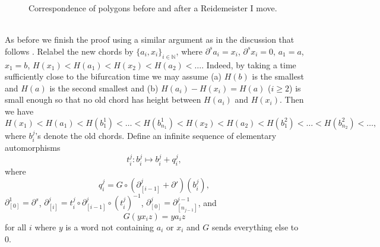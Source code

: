 \documentclass[11pt]{amsart}
\makeatletter
\renewenvironment{proof}[1][\proofname] {\par\pushQED{\qed}{\normalfont\bfseries\topsep6\p@\@plus6\p@\relax #1\@addpunct{.} }}{\popQED\endtrivlist\@endpefalse}
\theoremstyle{mystyle}
\newcommand{\<}{\langle}
\renewcommand{\>}{\rangle}
\makeatother
\begin{document}
\begin{proof}
\begin{proof}
\begin{figure}[h]
\begin{center}

                \caption{Correspondence of polygons before and after a Reidemeister I move.}
                \label{reidICorr2}
            \end{center}
        \end{figure}
	\end{proof}
	
	\text{ }\\ As before we finish the proof using a similar argument as in the discussion that follows \cite[Lemma 8.2]{chekanov2002dga}. Relabel the new chords by $\{a_i, x_i\}_{i \in \mathbb{N}}$, where $\partial^s a_i = x_i$, $\partial^s x_i = 0$, $a_1 = a$, $x_1 = b$, $H(x_1) < H(a_1) < H(x_2) < H(a_2) < \ldots$. Indeed, by taking a time sufficiently close to the bifurcation time we may assume (a) $H(b)$ is the smallest and $H(a)$ is the second smallest and (b) $H(a_i) - H(x_i) = H(a)$ ($i \geq 2$) is small enough so that no old chord has height between $H(a_i)$ and $H(x_i)$. Then we have \[H(x_1) < H(a_1) < H(b_1^1) < \ldots < H(b_{n_1}^1) < H(x_2) < H(a_2) < H(b_1^2) < \ldots < H(b_{n_2}^2) < \ldots,\] where $b_i^j$'s denote the old chords. Define an infinite sequence of elementary automorphisms \[t_i^j: b_i^j \mapsto b_i^j + q_i^j,\] where \[q_i^j = G \circ (\partial_{[i-1]}^j + \partial')(b_i^j),\] $\partial_{[0]}^1 = \partial^s$, $\partial_{[i]}^j = t_i^j \circ \partial_{[i-1]}^j \circ (t_i^j)^{-1}$, $\partial_{[0]}^j = \partial^{j-1}_{[n_{j-1}]}$, and \[G(y x_i z) = y a_i z\] for all $i$ where $y$ is a word not containing $a_i$ or $x_i$ and $G$ sends everything else to $0$.
    

\end{proof}
\end{document}

